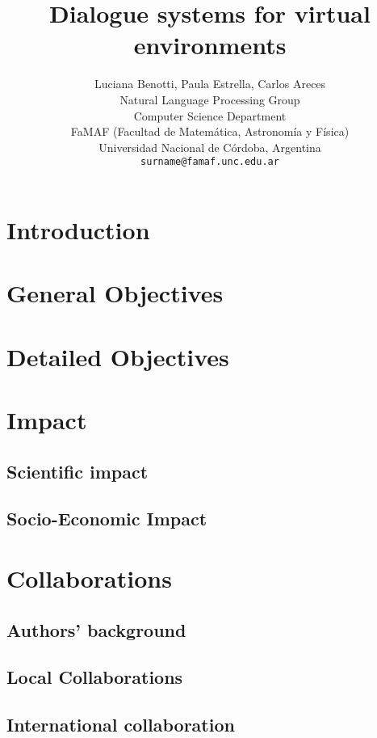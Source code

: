 \documentclass[11pt,letterpaper]{article}
\title{Dialogue systems for virtual environments}
\author{Luciana Benotti, Paula Estrella, Carlos Areces \\
 Natural Language Processing Group \\
Computer Science Department \\
FaMAF (Facultad de Matem\'atica, Astronom\'ia y F\'isica) \\
Universidad Nacional de C\'ordoba, Argentina \\
  {\tt surname@famaf.unc.edu.ar}
}
\date{}
\begin{document}
\maketitle
\begin{abstract}
\end{abstract}

\section{Introduction}




\section{General Objectives}



\section{Detailed Objectives}




\section{Impact}

\subsection{Scientific impact}



\subsection{Socio-Economic Impact}



\section{Collaborations}

\subsection{Authors' background}



\subsection{Local Collaborations}



\subsection{International collaboration}





\end{document}
